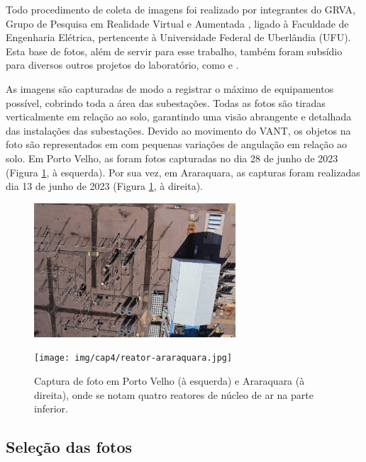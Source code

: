 Todo procedimento de coleta de imagens foi realizado por integrantes do GRVA, Grupo de Pesquisa em Realidade Virtual e Aumentada \cite{grva}, ligado à Faculdade de Engenharia Elétrica, pertencente à Universidade Federal de Uberlândia (UFU). Esta base de fotos, além de servir para esse trabalho, também foram subsídio para diversos outros projetos do laboratório, como \cite{neto2024estrategias} e \cite{junior2024soluccao}.

As imagens são capturadas de modo a registrar o máximo de equipamentos possível, cobrindo toda a área das subestações. Todas as fotos são tiradas verticalmente em relação ao solo, garantindo uma visão abrangente e detalhada das instalações das subestações. Devido ao movimento do VANT, os objetos na foto são representados em com pequenas variações de angulação em relação ao solo. Em Porto Velho, as foram fotos capturadas no dia 28 de junho de 2023 (Figura \ref{fig:reatores}, à esquerda). Por sua vez, em Araraquara, as capturas foram realizadas dia 13 de junho de 2023 (Figura  \ref{fig:reatores}, à direita).

\begin{figure}[!h]
    \centering
    \begin{minipage}[b]{0.45\linewidth}
        \centering
        \includegraphics[height=5cm]{img/cap4/reator-porto-velho.jpeg}
    \end{minipage}
    \hspace{0.05\linewidth}
    \begin{minipage}[b]{0.45\linewidth}
        \centering
        \texttt{[image: img/cap4/reator-araraquara.jpg]}
    \end{minipage}
    \captionsetup{justification=centering,margin=0.5cm,font=small}
    \caption{Captura de foto em Porto Velho (à esquerda) e Araraquara (à direita), onde se notam quatro reatores de núcleo de ar na parte inferior.} 
    \label{fig:reatores}
\end{figure}

\subsection{Seleção das fotos}

